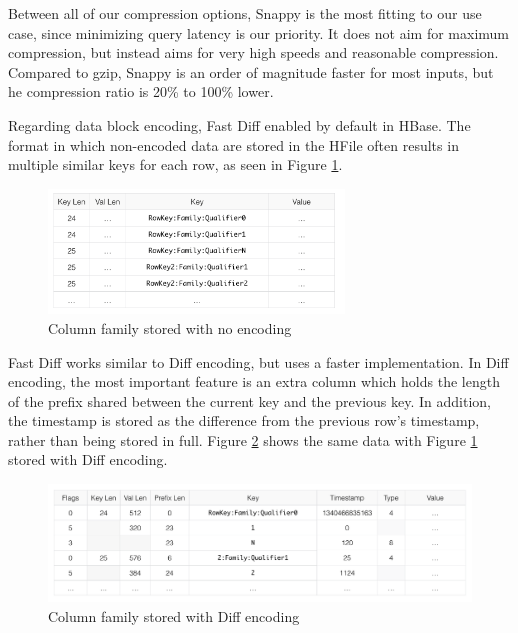 Between all of our compression options, Snappy is the most fitting to our use case, since minimizing query latency is our priority. It does not aim for maximum compression, but instead aims for very high speeds and reasonable compression. Compared to gzip, Snappy is an order of magnitude faster for most inputs, but he compression ratio is 20\% to 100\% lower. 

Regarding data block encoding, Fast Diff enabled by default in HBase. The format in which non-encoded data are stored in the HFile often results in multiple similar keys for each row, as seen in Figure \ref{figure:optimizations_no_encoding}.

\begin{figure}[H]
\centering
\includegraphics[width=0.7\textwidth]{figures/optimizations_no_encoding}
\caption{Column family stored with no encoding}
\label{figure:optimizations_no_encoding}
\end{figure}

Fast Diff works similar to Diff encoding, but uses a faster implementation. In Diff encoding, the most important feature is an extra column which holds the length of the prefix shared between the current key and the previous key. In addition, the timestamp is stored as the difference from the previous row's timestamp, rather than being stored in full. Figure \ref{figure:optimizations_diff_encoding} shows the same data with Figure \ref{figure:optimizations_no_encoding} stored with Diff encoding.

\begin{figure}[H]
\centering
\includegraphics[width=\textwidth]{figures/optimizations_diff_encoding}
\caption{Column family stored with Diff encoding}
\label{figure:optimizations_diff_encoding}
\end{figure}

